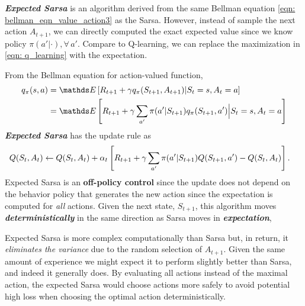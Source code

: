 \documentclass[11pt]{article}
\begin{document}
\textbf{\emph{Expected Sarsa}} is an algorithm derived from the same Bellman equation \eqref{eqn: bellman_eqn_value_action3} as the Sarsa. However, instead of sample the next action $A_{t+1}$, we can directly computed the exact expected value since we know policy $\pi(a'|\cdot), \forall\,a'$. Compare to Q-learning, we can replace the maximization in \eqref{eqn: q_learning} with the expectation. 

From the Bellman equation for action-valued function, 
\begin{align}
q_{\pi}(s, a) &= \E{}{R_{t+1} + \gamma q_{\pi}(S_{t+1}, A_{t+1}) | S_{t}=s, A_{t}=a} \nonumber\\
                    &=  \E{}{R_{t+1} + \gamma \sum_{a'}\pi(a'|S_{t+1})q_{\pi}(S_{t+1}, a') \Big| S_{t}=s, A_{t}=a} \label{eqn: bellman_eqn_value_action3}
\end{align}
\textbf{\emph{Expected Sarsa}} has the update rule as 
\begin{align}
Q(S_{t}, A_{t}) &\leftarrow Q(S_{t}, A_{t}) + \alpha_{t}\left[R_{t+1} + \gamma\sum_{a'}\pi(a'|S_{t+1})Q(S_{t+1}, a')  - Q(S_{t}, A_{t})\right]. \label{eqn: expected_sarsa_predict}
\end{align} Expected Sarsa is an \textbf{off-policy control} since the update does not depend on the behavior policy that generates the new action since the expectation is computed for \emph{all} actions. Given the next state, $S_{t+1}$, this algorithm moves \emph{\textbf{deterministically}} in the same direction as Sarsa moves in \textbf{\emph{expectation}},

Expected Sarsa is more complex computationally than Sarsa but, in return, it \emph{eliminates the variance} due to the random selection of $A_{t+1}$. Given the same amount of experience we might expect it to perform slightly better than Sarsa, and indeed it generally does. By evaluating all actions instead of the maximal action, the expected Sarsa would choose actions more safely to avoid potential high loss when choosing the optimal action deterministically. 
\end{document}
